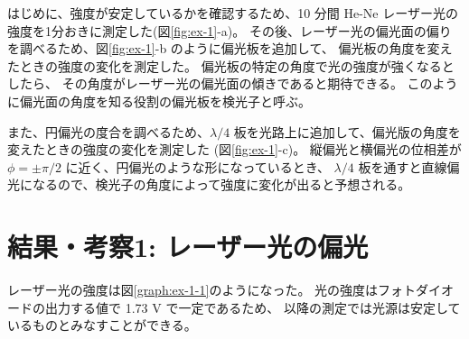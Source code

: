\documentclass[9pt,dvipdfmx,a4paper]{jsarticle}
\begin{document}
はじめに、強度が安定しているかを確認するため、10 分間 He-Ne レーザー光の強度を1分おきに測定した(図\ref{fig:ex-1}-a)。
その後、レーザー光の偏光面の偏りを調べるため、図\ref{fig:ex-1}-b のように偏光板を追加して、
偏光板の角度を変えたときの強度の変化を測定した。
偏光板の特定の角度で光の強度が強くなるとしたら、
その角度がレーザー光の偏光面の傾きであると期待できる。
このように偏光面の角度を知る役割の偏光板を検光子と呼ぶ。

また、円偏光の度合を調べるため、\(\lambda/4\) 板を光路上に追加して、偏光版の角度を変えたときの強度の変化を測定した
(図\ref{fig:ex-1}-c)。
縦偏光と横偏光の位相差が \(\phi=\pm\pi/2\) に近く、円偏光のような形になっているとき、
\(\lambda/4\) 板を通すと直線偏光になるので、検光子の角度によって強度に変化が出ると予想される。

\section{結果・考察1: レーザー光の偏光}
レーザー光の強度は図\ref{graph:ex-1-1}のようになった。
光の強度はフォトダイオードの出力する値で 1.73 V で一定であるため、
以降の測定では光源は安定しているものとみなすことができる。
\end{document}
